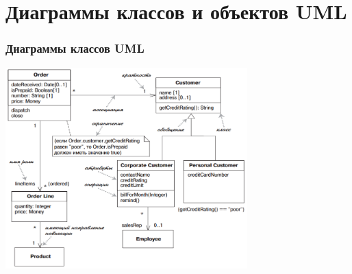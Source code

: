 \documentclass[xetex,mathserif,serif]{beamer}
\begin{document}
	\section{Диаграммы классов и объектов UML}

	\begin{frame}
		\frametitle{Диаграммы классов UML}
		\begin{center}
			\includegraphics[width=0.7\textwidth]{umlClassDiagram.png}
		\end{center}
	\end{frame}
\end{document}
